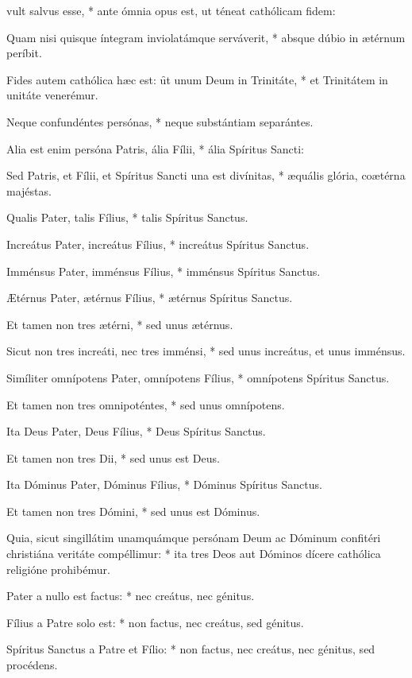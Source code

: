 \begin{psalmus}

 vult salvus esse, * ante ómnia opus est, ut téneat cathólicam fidem:

Quam nisi quisque íntegram inviolatámque serváverit, * absque dúbio in ætérnum períbit.

Fides autem cathólica hæc est: \f ut unum Deum in Trinitáte, * et Trinitátem in unitáte venerémur.

Neque confundéntes persónas, * neque substántiam separántes.

Alia est enim persóna Patris, ália Fílii, * ália Spíritus Sancti:

Sed Patris, et Fílii, et Spíritus Sancti una est divínitas, * æquális glória, coætérna majéstas.

Qualis Pater, talis Fílius, * talis Spíritus Sanctus.

Increátus Pater, increátus Fílius, * increátus Spíritus Sanctus.

Imménsus Pater, imménsus Fílius, * imménsus Spíritus Sanctus.

Ætérnus Pater, ætérnus Fílius, * ætérnus Spíritus Sanctus.

Et tamen non tres ætérni, * sed unus ætérnus.

Sicut non tres increáti, nec tres imménsi, * sed unus increátus, et unus imménsus.

Simíliter omnípotens Pater, omnípotens Fílius, * omnípotens Spíritus Sanctus.

Et tamen non tres omnipoténtes, * sed unus omnípotens.

Ita Deus Pater, Deus Fílius, * Deus Spíritus Sanctus.

Et tamen non tres Dii, * sed unus est Deus.

Ita Dóminus Pater, Dóminus Fílius, * Dóminus Spíritus Sanctus.

Et tamen non tres Dómini, * sed unus est Dóminus.

Quia, sicut singillátim unamquámque persónam Deum ac Dóminum confitéri christiána veritáte compéllimur: * ita tres Deos aut Dóminos dícere cathólica religióne prohibémur.

Pater a nullo est factus: * nec creátus, nec génitus.

Fílius a Patre solo est: * non factus, nec creátus, sed génitus.

Spíritus Sanctus a Patre et Fílio: * non factus, nec creátus, nec génitus, sed procédens.


\end{psalmus}
